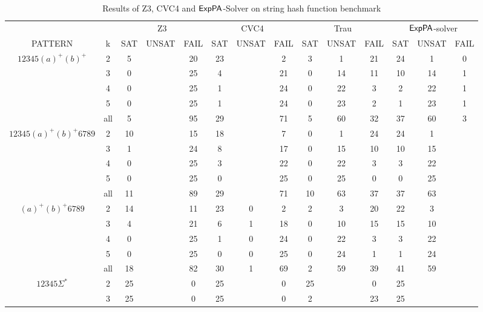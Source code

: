 \begin{table*}[]
    \label{table:string}
    \caption{Results of Z3, CVC4 and ${\sf ExpPA}$-Solver on string hash function benchmark}
    \begin{tabular}{cc|ccc|ccc|ccc|ccc}
        &  & \multicolumn{3}{c|}{Z3} & \multicolumn{3}{c|}{CVC4} & \multicolumn{3}{c|}{Trau} & \multicolumn{3}{c}{${\sf ExpPA}$-solver} \\
       PATTERN & k & SAT & UNSAT & FAIL & SAT & UNSAT & FAIL & SAT & UNSAT & FAIL & SAT & UNSAT & FAIL \\ \hline
       \multirow{5}{*}{$12345(a)^+(b)^+$} & 2 & 5 &  & 20 & 23 &  & 2 & 3 & 1 & 21 & 24 & 1 & 0 \\
        & 3 & 0 &  & 25 & 4 &  & 21 & 0 & 14 & 11 & 10 & 14 & 1 \\
        & 4 & 0 &  & 25 & 1 &  & 24 & 0 & 22 & 3 & 2 & 22 & 1 \\
        & 5 & 0 &  & 25 & 1 &  & 24 & 0 & 23 & 2 & 1 & 23 & 1 \\
        & all & 5 &  & 95 & 29 &  & 71 & 5 & 60 & 32 & 37 & 60 & 3 \\ \hline
       \multirow{5}{*}{$12345(a)^+(b)^+6789$} & 2 & 10 &  & 15 & 18 &  & 7 & 0 & 1 & 24 & 24 & 1 &  \\
        & 3 & 1 &  & 24 & 8 &  & 17 & 0 & 15 & 10 & 10 & 15 &  \\
        & 4 & 0 &  & 25 & 3 &  & 22 & 0 & 22 & 3 & 3 & 22 &  \\
        & 5 & 0 &  & 25 & 0 &  & 25 & 0 & 25 & 0 & 0 & 25 &  \\
        & all & 11 &  & 89 & 29 &  & 71 & 10 & 63 & 37 & 37 & 63 &  \\ \hline
       \multirow{5}{*}{$(a)^+(b)^+6789$} & 2 & 14 &  & 11 & 23 & 0 & 2 & 2 & 3 & 20 & 22 & 3 &  \\
        & 3 & 4 &  & 21 & 6 & 1 & 18 & 0 & 10 & 15 & 15 & 10 &  \\
        & 4 & 0 &  & 25 & 1 & 0 & 24 & 0 & 22 & 3 & 3 & 22 &  \\
        & 5 & 0 &  & 25 & 0 & 0 & 25 & 0 & 24 & 1 & 1 & 24 &  \\
        & all & 18 &  & 82 & 30 & 1 & 69 & 2 & 59 & 39 & 41 & 59 &  \\ \hline
       \multirow{5}{*}{$12345\Sigma^*$} & 2 & 25 &  & 0 & 25 &  & 0 & 25 &  & 0 & 25 &  &  \\
        & 3 & 25 &  & 0 & 25 &  & 0 & 2 &  & 23 & 25 &  &  \\

\end{tabular}
\end{table*}
